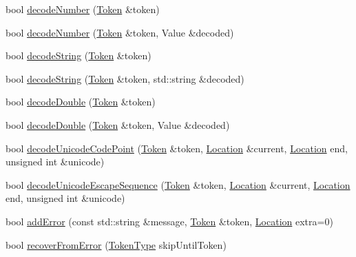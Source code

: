 \begin{DoxyCompactItemize}
\item 
bool \hyperlink{class_json_1_1_our_reader_a272d271290933a89abfd5096dd69c9e9}{decode\+Number} (\hyperlink{class_json_1_1_our_reader_1_1_token}{Token} \&token)
\item 
bool \hyperlink{class_json_1_1_our_reader_a712270d53a2f023c2f406ac813548340}{decode\+Number} (\hyperlink{class_json_1_1_our_reader_1_1_token}{Token} \&token, Value \&decoded)
\item 
bool \hyperlink{class_json_1_1_our_reader_a34e31d8b8399b7ad493359702b6de6c9}{decode\+String} (\hyperlink{class_json_1_1_our_reader_1_1_token}{Token} \&token)
\item 
bool \hyperlink{class_json_1_1_our_reader_a44b589a85f02f0e2de1b4ad6916be0c5}{decode\+String} (\hyperlink{class_json_1_1_our_reader_1_1_token}{Token} \&token, std\+::string \&decoded)
\item 
bool \hyperlink{class_json_1_1_our_reader_a1d1c3b44f6720a0e7c39b5ae8de3981c}{decode\+Double} (\hyperlink{class_json_1_1_our_reader_1_1_token}{Token} \&token)
\item 
bool \hyperlink{class_json_1_1_our_reader_aa5c15a8cd32754f07430dedba3d1308e}{decode\+Double} (\hyperlink{class_json_1_1_our_reader_1_1_token}{Token} \&token, Value \&decoded)
\item 
bool \hyperlink{class_json_1_1_our_reader_ac1bf03c161ece082e48da450c50f528d}{decode\+Unicode\+Code\+Point} (\hyperlink{class_json_1_1_our_reader_1_1_token}{Token} \&token, \hyperlink{class_json_1_1_our_reader_a1bdc7bbc52ba87cae6b19746f2ee0189}{Location} \&current, \hyperlink{class_json_1_1_our_reader_a1bdc7bbc52ba87cae6b19746f2ee0189}{Location} end, unsigned int \&unicode)
\item 
bool \hyperlink{class_json_1_1_our_reader_adb39be814cc6076b91a0919bdd5b24b0}{decode\+Unicode\+Escape\+Sequence} (\hyperlink{class_json_1_1_our_reader_1_1_token}{Token} \&token, \hyperlink{class_json_1_1_our_reader_a1bdc7bbc52ba87cae6b19746f2ee0189}{Location} \&current, \hyperlink{class_json_1_1_our_reader_a1bdc7bbc52ba87cae6b19746f2ee0189}{Location} end, unsigned int \&unicode)
\item 
bool \hyperlink{class_json_1_1_our_reader_a5a48b71c1c16fa671814c8338e452bc0}{add\+Error} (const std\+::string \&message, \hyperlink{class_json_1_1_our_reader_1_1_token}{Token} \&token, \hyperlink{class_json_1_1_our_reader_a1bdc7bbc52ba87cae6b19746f2ee0189}{Location} extra=0)
\item 
bool \hyperlink{class_json_1_1_our_reader_a035651f0700a76a815e5f904c63ebb1c}{recover\+From\+Error} (\hyperlink{class_json_1_1_our_reader_a15116f7276ddf1e7a2cc3cbefa884dcc}{Token\+Type} skip\+Until\+Token)

\end{DoxyCompactItemize}
